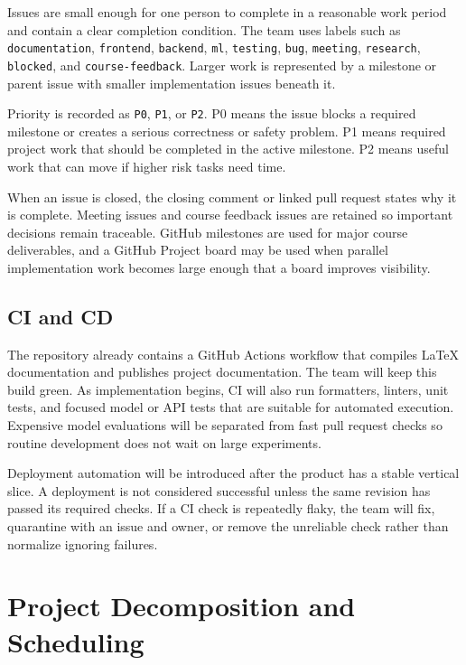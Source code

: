 \documentclass{article}
\begin{document}
Issues are small enough for one person to complete in a reasonable work period and contain a clear completion condition. The team uses labels such as \texttt{documentation}, \texttt{frontend}, \texttt{backend}, \texttt{ml}, \texttt{testing}, \texttt{bug}, \texttt{meeting}, \texttt{research}, \texttt{blocked}, and \texttt{course-feedback}. Larger work is represented by a milestone or parent issue with smaller implementation issues beneath it.

Priority is recorded as \texttt{P0}, \texttt{P1}, or \texttt{P2}. P0 means the issue blocks a required milestone or creates a serious correctness or safety problem. P1 means required project work that should be completed in the active milestone. P2 means useful work that can move if higher risk tasks need time.

When an issue is closed, the closing comment or linked pull request states why it is complete. Meeting issues and course feedback issues are retained so important decisions remain traceable. GitHub milestones are used for major course deliverables, and a GitHub Project board may be used when parallel implementation work becomes large enough that a board improves visibility.

\subsection{CI and CD}

The repository already contains a GitHub Actions workflow that compiles LaTeX documentation and publishes project documentation. The team will keep this build green. As implementation begins, CI will also run formatters, linters, unit tests, and focused model or API tests that are suitable for automated execution. Expensive model evaluations will be separated from fast pull request checks so routine development does not wait on large experiments.

Deployment automation will be introduced after the product has a stable vertical slice. A deployment is not considered successful unless the same revision has passed its required checks. If a CI check is repeatedly flaky, the team will fix, quarantine with an issue and owner, or remove the unreliable check rather than normalize ignoring failures.

\section{Project Decomposition and Scheduling}
\end{document}
